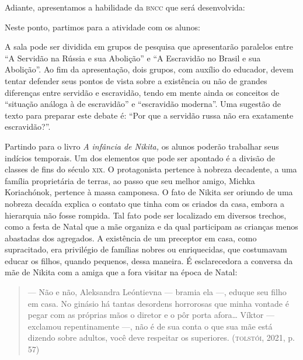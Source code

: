 \documentclass[11pt]{extarticle}
\begin{document}
Adiante, apresentamos a habilidade da \textsc{bncc} que será desenvolvida:


Neste ponto, partimos para a atividade com os alunos:

A sala pode ser dividida em grupos de pesquisa que apresentarão
paralelos entre ``A Servidão na Rússia e sua Abolição'' e ``A Escravidão
no Brasil e sua Abolição''. Ao fim da apresentação, dois grupos, com
auxílio do educador, devem tentar defender seus pontos de vista sobre a
existência ou não de grandes diferenças entre servidão e escravidão,
tendo em mente ainda os conceitos de ``situação análoga à de
escravidão'' e ``escravidão moderna''. Uma sugestão de texto para
preparar este debate é: ``Por que a servidão russa não era exatamente
escravidão?''.


Partindo para o livro \emph{A infância de Nikita,} os alunos poderão
trabalhar seus indícios temporais. Um dos elementos que pode ser
apontado é a divisão de classes de fins do século \textsc{xix}. O protagonista
pertence à nobreza decadente, a uma família proprietária de terras, ao
passo que seu melhor amigo, Michka Koriachónok, pertence à massa
camponesa. O fato de Nikita ser oriundo de uma nobreza decaída explica o
contato que tinha com os criados da casa, embora a hierarquia não fosse
rompida. Tal fato pode ser localizado em diversos trechos, como a festa
de Natal que a mãe organiza e da qual participam as crianças menos
abastadas dos agregados. A existência de um preceptor em casa, como
supracitado, era privilégio de famílias nobres ou enriquecidas, que
costumavam educar os filhos, quando pequenos, dessa maneira. É
esclarecedora a conversa da mãe de Nikita com a amiga que a fora visitar
na época de Natal:

\begin{quote}
--- Não e não, Aleksandra Leóntievna --- bramia ela ---, eduque seu
filho em casa. No ginásio há tantas desordens horrorosas que minha
vontade é pegar com as próprias mãos o diretor e o pôr porta afora\ldots{}
Víktor --- exclamou repentinamente ---, não é de sua conta o que sua mãe
está dizendo sobre adultos, você deve respeitar os superiores.
(\textsc{tolstói}, 2021, p. 57)
\end{quote}
\end{document}
